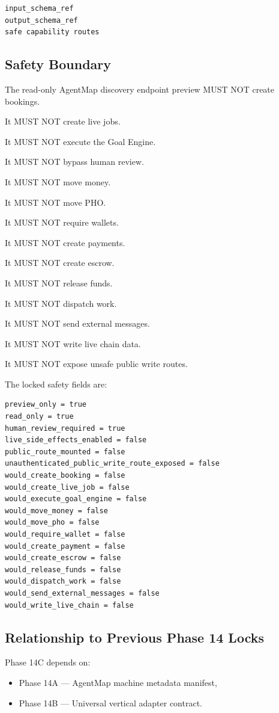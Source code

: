 \documentclass[11pt]{article}
\begin{document}
\begin{verbatim}
input_schema_ref
output_schema_ref
safe capability routes
\end{verbatim}

\subsection{Safety Boundary}

The read-only AgentMap discovery endpoint preview MUST NOT create bookings.

It MUST NOT create live jobs.

It MUST NOT execute the Goal Engine.

It MUST NOT bypass human review.

It MUST NOT move money.

It MUST NOT move PHO.

It MUST NOT require wallets.

It MUST NOT create payments.

It MUST NOT create escrow.

It MUST NOT release funds.

It MUST NOT dispatch work.

It MUST NOT send external messages.

It MUST NOT write live chain data.

It MUST NOT expose unsafe public write routes.

The locked safety fields are:

\begin{verbatim}
preview_only = true
read_only = true
human_review_required = true
live_side_effects_enabled = false
public_route_mounted = false
unauthenticated_public_write_route_exposed = false
would_create_booking = false
would_create_live_job = false
would_execute_goal_engine = false
would_move_money = false
would_move_pho = false
would_require_wallet = false
would_create_payment = false
would_create_escrow = false
would_release_funds = false
would_dispatch_work = false
would_send_external_messages = false
would_write_live_chain = false
\end{verbatim}

\subsection{Relationship to Previous Phase 14 Locks}

Phase 14C depends on:

\begin{itemize}
  \item Phase 14A --- AgentMap machine metadata manifest,
  \item Phase 14B --- Universal vertical adapter contract.
\end{itemize}
\end{document}
